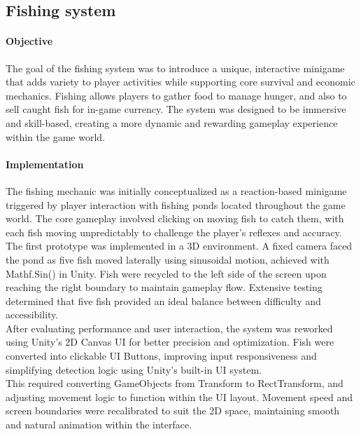 \documentclass{article}
\begin{document}
\newpage
\subsection{Fishing system}
\paragraph{Objective}\hfill

The goal of the fishing system was to introduce a unique, interactive minigame that adds variety to player activities while supporting core survival and economic mechanics. Fishing allows players to gather food to manage hunger, and also to sell caught fish for in-game currency. The system was designed to be immersive and skill-based, creating a more dynamic and rewarding gameplay experience within the game world.

\paragraph{Implementation}\hfill

The fishing mechanic was initially conceptualized as a reaction-based minigame triggered by player interaction with fishing ponds located throughout the game world. The core gameplay involved clicking on moving fish to catch them, with each fish moving unpredictably to challenge the player's reflexes and accuracy.\\

The first prototype was implemented in a 3D environment. A fixed camera faced the pond as five fish moved laterally using sinusoidal motion, achieved with Mathf.Sin() in Unity. Fish were recycled to the left side of the screen upon reaching the right boundary to maintain gameplay flow. Extensive testing determined that five fish provided an ideal balance between difficulty and accessibility.\\

After evaluating performance and user interaction, the system was reworked using Unity's 2D Canvas UI for better precision and optimization. Fish were converted into clickable UI Buttons, improving input responsiveness and simplifying detection logic using Unity's built-in UI system.\\

This required converting GameObjects from Transform to RectTransform, and adjusting movement logic to function within the UI layout. Movement speed and screen boundaries were recalibrated to suit the 2D space, maintaining smooth and natural animation within the interface.\\
\end{document}

